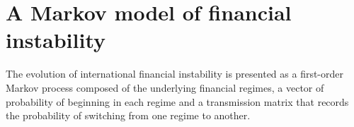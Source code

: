 \documentclass[12pt, a4paper, oneside]{article} %
\begin{document}



\section{A Markov model of financial instability}
The evolution of international financial instability is presented as a first-order Markov process composed of the underlying financial regimes, a vector of probability of beginning in each regime and a transmission matrix that records the probability of switching from one regime to another. 
\end{document}
